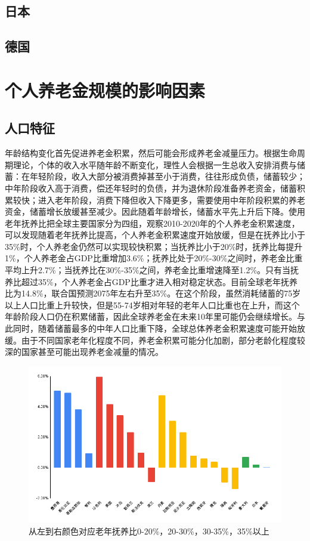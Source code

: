 \documentclass[a4paper,10.5pt]{ctexart}
\begin{document}
\subsection{日本}
\subsection{德国}

\section{个人养老金规模的影响因素}

\subsection{人口特征}
年龄结构变化首先促进养老金积累，然后可能会形成养老金减量压力。根据生命周期理论\cite{ando1963life}，个体的收入水平随年龄不断变化，理性人会根据一生总收入安排消费与储蓄：在年轻阶段，收入大部分被消费掉甚至小于消费，往往形成负债，储蓄较少；中年阶段收入高于消费，偿还年轻时的负债，并为退休阶段准备养老资金，储蓄积累较快；进入老年阶段，消费下降但收入下降更多，需要使用中年阶段积累的养老资金，储蓄增长放缓甚至减少。因此随着年龄增长，储蓄水平先上升后下降。使用老年抚养比把全球主要国家分为四组，观察2010-2020年的个人养老金积累速度，可以发现随着老年抚养比提高，个人养老金积累速度开始放缓，但是在抚养比小于35\%时，个人养老金仍然可以实现较快积累；当抚养比小于20\%时，抚养比每提升1\%，个人养老金占GDP比重增加3.6\%；抚养比处于20\%-30\%之间时，养老金比重平均上升2.7\%；当抚养比在30\%-35\%之间，养老金比重增速降至1.2\%。只有当抚养比超过35\%，个人养老金占GDP比重才进入相对稳定状态。目前全球老年抚养比为14.8\%，联合国预测2075年左右升至35\%。在这个阶段，虽然消耗储蓄的75岁以上人口比重上升较快，但是55-74岁相对年轻的老年人口比重也在上升，而这个年龄阶段人口仍在积累储蓄，因此全球养老金在未来10年里可能仍会继续增长。与此同时，随着储蓄最多的中年人口比重下降，全球总体养老金积累速度可能开始放缓。由于不同国家老年化程度不同，养老金积累可能分化加剧，部分老龄化程度较深的国家甚至可能出现养老金减量的情况。
\begin{figure}[H]
    \includegraphics[width=\linewidth]{img/随着老年付养比提高，养老金积累增速开始下降.png}
    \caption{从左到右颜色对应老年抚养比0-20\%，20-30\%，30-35\%，35\%以上}
\end{figure}
\end{document}
